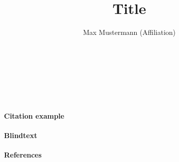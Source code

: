 \documentclass[
12pt,a4paper
]{article}
\author{Max Mustermann (Affiliation)}
\title{Title}
\makeatletter
\renewcommand\maketitle{
  ~\vspace{-1.1cm}\newline
  {\raggedright
    \renewcommand{\baselinestretch}{1.2}\selectfont
  {\bfseries\large\@title}\\[2ex]
  {\large\@author}\\[2ex]
  }
}
\makeatother
\begin{document}
\maketitle


\paragraph{Citation example}



\paragraph{Blindtext} \lipsum

\paragraph{References}
{\tiny
\printbibliography[heading=none]
}
\end{document}
